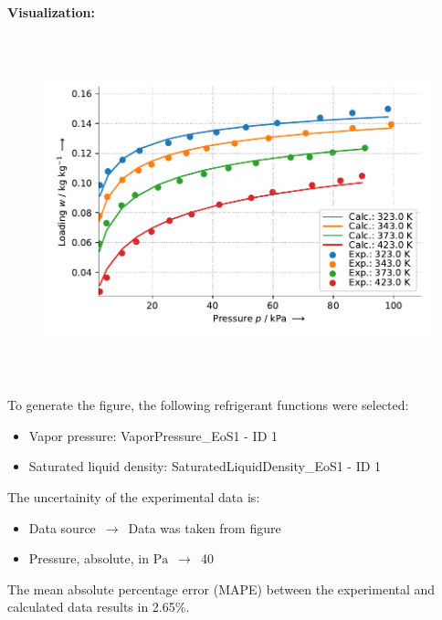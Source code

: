 \textbf{Visualization:}
%
\begin{figure}[!htp]
{\noindent\includegraphics[height=10cm, keepaspectratio]{figs/ads/ads_Propylene_zeolite_crystal_5A_Toth_1.pdf}}
\end{figure}
%

To generate the figure, the following refrigerant functions were selected:
\begin{itemize}
\item Vapor pressure: VaporPressure\_EoS1 - ID 1
\item Saturated liquid density: SaturatedLiquidDensity\_EoS1 - ID 1
\end{itemize}

The uncertainity of the experimental data is:
\begin{itemize}
\item Data source $\,\to\,$ Data was taken from figure
\item Pressure, absolute, in $\si{\pascal}$ $\,\to\,$ 40
\end{itemize}

The mean absolute percentage error (MAPE) between the experimental and calculated data results in 2.65\%.
\FloatBarrier
\newpage
